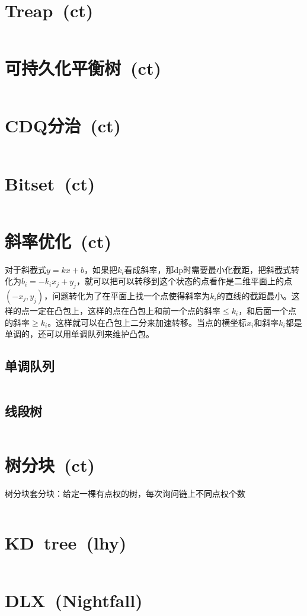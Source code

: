 \section{Treap\ \small(ct)}
	\inputminted{cpp}{data_structure/treap.cpp}
\section{可持久化平衡树\ \small(ct)}
	\inputminted{cpp}{data_structure/functional_treap.cpp}
\section{CDQ分治\ \small(ct)}
	\inputminted{cpp}{data_structure/cdq_divide.cpp}
\section{Bitset\ \small(ct)}
	\inputminted{cpp}{data_structure/bitset.cpp}
\section{斜率优化\ \small(ct)}
	对于斜截式$ y = k x + b $，如果把$ k_i $看成斜率，那dp时需要最小化截距，把斜截式转化为$ b_i = - k_i x_j + y_j $，就可以把可以转移到这个状态的点看作是二维平面上的点$ (- x_j, y_j) $，问题转化为了在平面上找一个点使得斜率为$ k_i $的直线的截距最小。这样的点一定在凸包上，这样的点在凸包上和前一个点的斜率$ \leq k_i$，和后面一个点的斜率$ \geq k_i $。这样就可以在凸包上二分来加速转移。当点的横坐标$ x_i $和斜率$ k_i $都是单调的，还可以用单调队列来维护凸包。
	\subsection*{单调队列}
		\inputminted{cpp}{data_structure/slope_optimize_queue.cpp}
	\subsection*{线段树}
		\inputminted{cpp}{data_structure/slope_optimize_segment.cpp}
\section{树分块\ \small(ct)}
	树分块套分块：给定一棵有点权的树，每次询问链上不同点权个数
	\inputminted{cpp}{data_structure/tree_block.cpp}
\section{KD\ tree\ \small(lhy)}
	\inputminted{cpp}{data_structure/kd_tree.cpp}
\section{DLX\ \small(Nightfall)}
	\inputminted{cpp}{data_structure/dlx.cpp}
